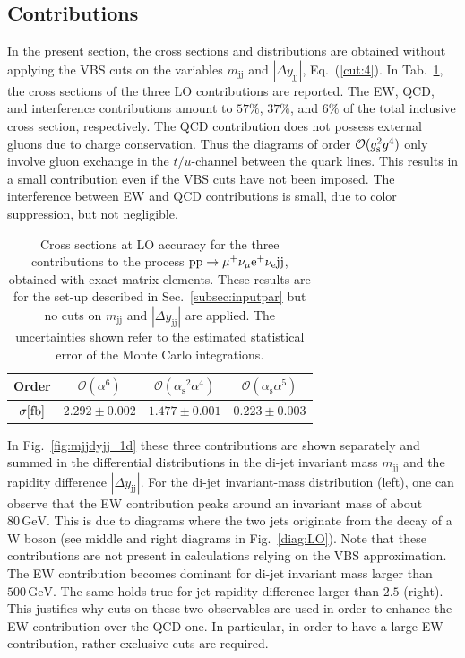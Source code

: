 \documentclass[twocolumn,epjc3]{svjour3} %
\newcommand{\Pj}{\ensuremath{\text{j}}\xspace}
\newcommand{\GeV}{\ensuremath{\,\text{GeV}}\xspace}
\newcommand{\alphas}{\ensuremath{\alpha_\text{s}}\xspace}
\begin{document}
    \subsection{Contributions}
        \label{subsec:contributions}
    In the present section, the cross sections and distributions are obtained without applying the VBS cuts on the variables $m_{\Pj\Pj}$ and $|\Delta y_{\Pj\Pj}|$, 
    Eq.~(\ref{cut:4}).
    In Tab.~\ref{tab:LOscanXsec}, the cross sections of the three LO contributions are reported.
    The EW, QCD, and interference contributions amount to $57\%$, $37\%$, and $6\%$ of the total inclusive cross section, respectively.
    The QCD contribution does not possess external gluons due to charge conservation.
    Thus the diagrams of order $\mathcal{O}(g_{\rm s}^2g^4)$ only involve gluon exchange in the $t/u$-channel between the quark lines.
    This results in a small contribution even if the VBS cuts have not been imposed.
    The interference between EW and QCD contributions is small, due to color suppression, but not negligible.

    \begin{table}[h!]
        \centering
        \begin{tabular}{c|c|c|c}
            Order & $\mathcal{O}(\alpha^6)$ & $\mathcal{O}(\alphas^2\alpha^4)$ & $\mathcal{O}(\alphas\alpha^5)$ \\
            \hline
            \hline
            $\sigma[\rm{fb}]$ & $ 2.292 \pm 0.002 $ & $ 1.477 \pm 0.001 $ & $ 0.223 \pm 0.003 $ \\
        \end{tabular}
        \caption{\label{tab:LOscanXsec} Cross sections at LO accuracy for the three contributions to the process ${\rm p}{\rm p}\to\mu^+\nu_\mu{\rm e}^+\nu_{\rm e}{\rm j}{\rm j}$, obtained with exact matrix elements.
        These results are for the set-up described in Sec.~\protect\ref{subsec:inputpar} but no cuts on $m_{\Pj\Pj}$ and $|\Delta y_{\Pj\Pj}|$ are applied.
        The uncertainties shown refer to the estimated statistical error of the Monte Carlo integrations.}
    \end{table}

    In Fig.~\ref{fig:mjjdyjj_1d} these three contributions are shown separately and summed in the differential distributions in the di-jet invariant mass $m_{\Pj\Pj}$ and the rapidity difference $|\Delta y_{\Pj\Pj}|$.
    For the di-jet invariant-mass distribution (left), one can observe that the EW contribution peaks around an invariant mass of about $80\GeV$.
    This is due to diagrams where the two jets originate from the decay of a W boson (see middle and right diagrams in Fig.~\ref{diag:LO}).
    Note that these contributions are not present in calculations relying on the VBS approximation.
    The EW contribution becomes dominant for di-jet invariant mass larger than $500\GeV$.
    The same holds true for jet-rapidity difference larger than $2.5$ (right).
    This justifies why cuts on these two observables are used in order to enhance the EW contribution over the QCD one.
    In particular, in order to have a large EW contribution, rather exclusive cuts are required.
\end{document}
